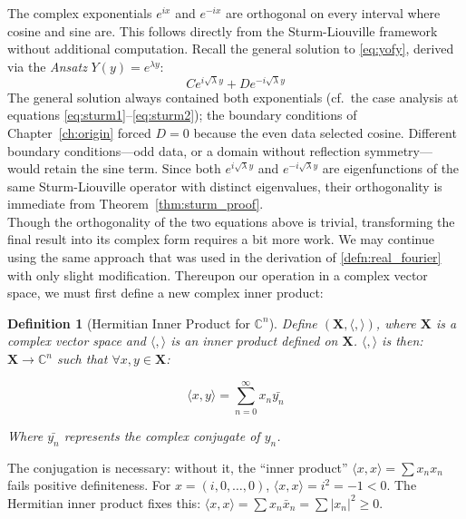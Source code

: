 \documentclass[12pt,a4paper]{report}
\theoremstyle{thms}
\theoremstyle{defns}
\newtheorem{definition}{Definition}[section]
\begin{document}
The complex exponentials $e^{ix}$ and $e^{-ix}$ are orthogonal on every interval where cosine and sine are. This follows directly from the Sturm-Liouville framework without additional computation. Recall the general solution to \eqref{eq:yofy}, derived via the \textit{Ansatz} $Y(y) = e^{\lambda y}$:
\begin{equation}
    Ce^{i\sqrt{\lambda}y} + De^{-i\sqrt{\lambda}y}
\end{equation}
The general solution always contained both exponentials (cf.\ the case analysis at equations \eqref{eq:sturm1}--\eqref{eq:sturm2}); the boundary conditions of Chapter~\ref{ch:origin} forced $D = 0$ because the even data selected cosine. Different boundary conditions—odd data, or a domain without reflection symmetry—would retain the sine term. Since both $e^{i\sqrt{\lambda}y}$ and $e^{-i\sqrt{\lambda}y}$ are eigenfunctions of the same Sturm-Liouville operator with distinct eigenvalues, their orthogonality is immediate from Theorem~\ref{thm:sturm_proof}.\\
Though the orthogonality of the two equations above is trivial, transforming the final result into its complex form requires a bit more work. We may continue using the same approach that was used in the derivation of \eqref{defn:real_fourier} with only slight modification. Thereupon our operation in a complex vector space, we must first define a new complex inner product:

\begin{definition}[Hermitian Inner Product for $\mathbb{C}^n$]
    Define $(\mathbf{X}, \langle, \rangle)$, where $\mathbf{X}$ is a complex vector space and $\langle, \rangle$ is an inner product defined on $\mathbf{X}$. $\langle, \rangle$  is then:  $\mathbf{X} \rightarrow \mathbb{C}^n$ such that $\forall x, y \in  \mathbf{X}$:

    \begin{equation}
        \langle x, y \rangle = \sum_{n=0}^{\infty}x_n\bar{y_n}
    \end{equation}

    Where $\bar{y_n}$ represents the complex conjugate of $y_n$.
\end{definition}

The conjugation is necessary: without it, the ``inner product'' $\langle x, x \rangle = \sum x_n x_n$ fails positive definiteness. For $x = (i, 0, \ldots, 0)$, $\langle x, x \rangle = i^2 = -1 < 0$. The Hermitian inner product fixes this: $\langle x, x \rangle = \sum x_n\bar{x}_n = \sum |x_n|^2 \geq 0$.
\end{document}
